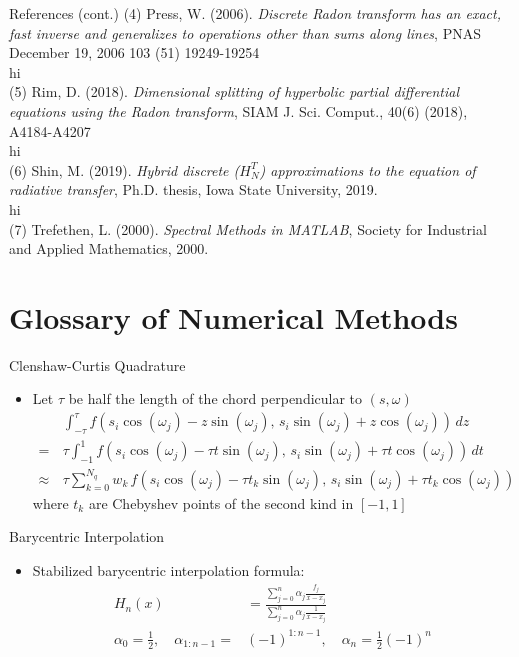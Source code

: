 \documentclass{beamer}
\begin{document}
\begin{frame}{References (cont.)}
    (4) Press, W. (2006). \textit{Discrete Radon transform has an exact, fast inverse and generalizes to operations other than sums along lines}, PNAS December 19, 2006 103 (51) 19249-19254
        \\ \color{white} hi \color{black} \\
    (5) Rim, D. (2018). \textit{Dimensional splitting of hyperbolic partial differential equations using the Radon transform}, SIAM J. Sci. Comput., 40(6) (2018), A4184-A4207
        \\ \color{white} hi \color{black} \\
    (6) Shin, M. (2019). \textit{Hybrid discrete ($H^T_N$) approximations to the equation of radiative transfer}, Ph.D. thesis, Iowa State University, 2019.
        \\ \color{white} hi \color{black} \\
    (7) Trefethen, L. (2000). \textit{Spectral Methods in MATLAB}, Society for Industrial and Applied Mathematics, 2000.
\end{frame}

\section*{Glossary of Numerical Methods}
\begin{frame}{Clenshaw-Curtis Quadrature}
    \begin{itemize}
        \item Let $\tau$ be half the length of the chord perpendicular to $(s, \omega)$
        \begin{align*}
        	& \int_{-\tau}^{\tau} f(s_{i} \cos (\omega_{j}) - z \sin (\omega_{j}), \, s_{i} \sin (\omega_{j}) + z \cos (\omega_{j})) \, dz \\
        	= \, & \tau \int_{-1}^{1} f(s_{i} \cos (\omega_{j}) - \tau t \sin (\omega_{j}), \, s_{i} \sin (\omega_{j}) + \tau t \cos (\omega_{j})) \, dt \\
            \approx \, & \tau \sum_{k=0}^{N_q} w_{k} \, f(s_{i} \cos (\omega_{j}) - \tau t_{k} \sin (\omega_{j}), \, s_{i} \sin (\omega_{j}) + \tau t_{k} \cos (\omega_{j}))
        \end{align*}
    where $t_k$ are Chebyshev points of the second kind in $[-1, 1]$
    \end{itemize}
\end{frame}

\begin{frame}{Barycentric Interpolation}
\begin{itemize}
    \item
        Stabilized barycentric interpolation formula:
\begin{align*}
    H_n(x)&= \frac{\sum_{j = 0}^{n} \alpha_j \frac{f_j}{x-x_j}}{\sum_{j = 0}^{n} \alpha_j\frac{1}{x-x_j}} \\ 
    \alpha_0 = \frac{1}{2},\quad \alpha_{1:n-1} = &(-1)^{1:n-1},\quad \alpha_n = \frac{1}{2} (-1)^n \\
\end{align*} 
\end{itemize}
\end{frame}
\end{document}
